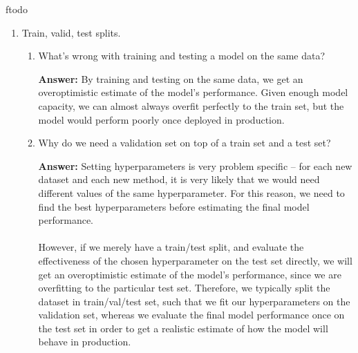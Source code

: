 ƒtodo\documentclass{article}
\newenvironment{QandA}{\begin{enumerate}[label=\arabic*.]}{\end{enumerate}}
\newenvironment{InnerQandA}{\begin{enumerate}[label=\roman*.]}{\end{enumerate}}
\newenvironment{answer}{\par\normalfont \textbf{Answer:}}{}
\begin{document}
\begin{QandA}
\begin{InnerQandA}
\begin{answer}
            (Source: \href{https://en.wikipedia.org/wiki/Cross-validation_(statistics)}{Wikipedia}, \href{https://www.upgrad.com/blog/cross-validation-in-machine-learning/}{Upgrad})
        \end{answer}

        \item Why don’t we see more cross-validation in deep learning?
        \begin{answer}
            With large datasets, it's very computationally expensive to perform K-fold / Leave-P-Out cross validation. These types of cross validation are most useful when the dataset is on the order of hundreds of examples. Therefore, in practice people usually perform the holdout method by splitting the dataset into train/val/test. 

            (Source: Yours truly, \href{https://www.quora.com/Is-cross-validation-heavily-used-in-deep-learning-or-is-it-too-expensive-to-be-used}{Yoshua Bengio})
        \end{answer}
    \end{InnerQandA}

    \item Train, valid, test splits.
    \begin{InnerQandA}
        \item What’s wrong with training and testing a model on the same data?
        \begin{answer}
            By training and testing on the same data, we get an overoptimistic estimate of the model's performance. Given enough model capacity, we can almost always overfit perfectly to the train set, but the model would perform poorly once deployed in production. 
        \end{answer}

        \item Why do we need a validation set on top of a train set and a test set?
        \begin{answer}
            Setting hyperparameters is very problem specific -- for each new dataset and each new method, it is very likely that we would need different values of the same hyperparameter. For this reason, we need to find the best hyperparameters before estimating the final model performance.\\\\
            However, if we merely have a train/test split, and evaluate the effectiveness of the chosen hyperparameter on the test set directly, we will get an overoptimistic estimate of the model's performance, since we are overfitting to the particular test set. Therefore, we typically split the dataset in train/val/test set, such that we fit our hyperparameters on the validation set, whereas we evaluate the final model performance once on the test set in order to get a realistic estimate of how the model will behave in production. 
        \end{answer}


\end{InnerQandA}
\end{QandA}
\end{document}
